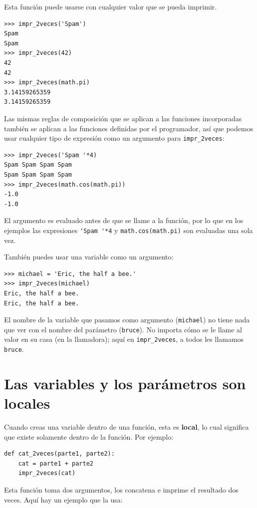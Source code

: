 \documentclass[10pt]{book}
\begin{document}
Esta función puede usarse con cualquier valor que se pueda imprimir.

\begin{verbatim}
>>> impr_2veces('Spam')
Spam
Spam
>>> impr_2veces(42)
42
42
>>> impr_2veces(math.pi)
3.14159265359
3.14159265359
\end{verbatim}
%
Las mismas reglas de composición que se aplican a las funciones incorporadas también
se aplican a las funciones definidas por el programador, así que podemos usar cualquier tipo de expresión
como un argumento para \verb"impr_2veces":

\begin{verbatim}
>>> impr_2veces('Spam '*4)
Spam Spam Spam Spam
Spam Spam Spam Spam
>>> impr_2veces(math.cos(math.pi))
-1.0
-1.0
\end{verbatim}
%
El argumento es evaluado antes de que se llame a la función, por lo que
en los ejemplos las expresiones \verb"'Spam '*4" y
{\tt math.cos(math.pi)} son evaluadas una sola vez.

También puedes usar una variable como un argumento:

\begin{verbatim}
>>> michael = 'Eric, the half a bee.'
>>> impr_2veces(michael)
Eric, the half a bee.
Eric, the half a bee.
\end{verbatim}
%
El nombre de la variable que pasamos como argumento ({\tt michael}) no tiene
nada que ver con el nombre del parámetro ({\tt bruce}).  No
importa cómo se le llame al valor en su casa (en la llamadora);
aquí en \verb"impr_2veces", a todos les llamamos {\tt bruce}.


\section{Las variables y los parámetros son locales}

Cuando creas una variable dentro de una función, esta es {\bf local},
lo cual significa que existe
solamente dentro de la función.  Por ejemplo:

\begin{verbatim}
def cat_2veces(parte1, parte2):
    cat = parte1 + parte2
    impr_2veces(cat)
\end{verbatim}
%
Esta función toma dos argumentos, los concatena e imprime
el resultado dos veces.  Aquí hay un ejemplo que la usa:
\end{document}
